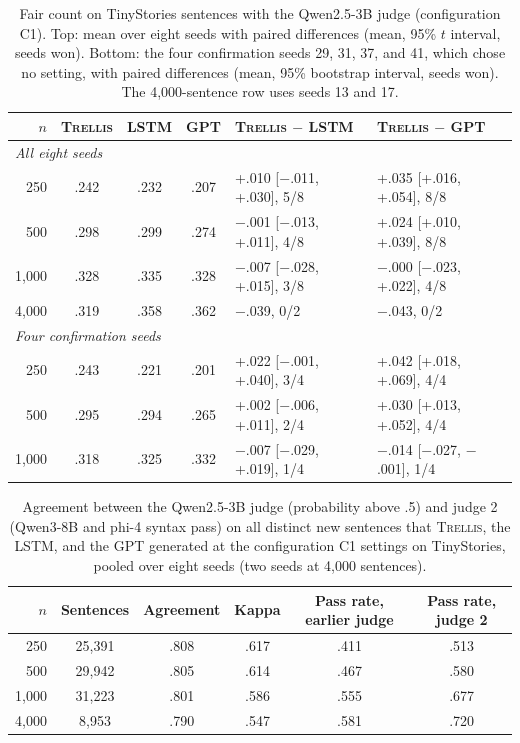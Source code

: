 \documentclass[11pt,letterpaper]{article}
\newcommand{\trellis}{\textsc{Trellis}}
\begin{document}
\begin{table}[h]
\caption{Fair count on TinyStories sentences with the Qwen2.5-3B judge (configuration C1). Top: mean over eight seeds with paired differences (mean, 95\% $t$ interval, seeds won).
Bottom: the four confirmation seeds 29, 31, 37, and 41, which chose no setting, with paired differences (mean, 95\% bootstrap interval, seeds won). The 4,000-sentence row uses seeds 13 and 17.}
\label{tab:genold}
\begin{center}
\footnotesize
\begin{tabular}{rcccll}
\toprule
$n$ & \trellis{} & LSTM & GPT & \trellis{} $-$ LSTM & \trellis{} $-$ GPT \\
\midrule
\multicolumn{6}{l}{\textit{All eight seeds}} \\
250   & .242 & .232 & .207 & +.010 [$-$.011, +.030], 5/8 & +.035 [+.016, +.054], 8/8 \\
500   & .298 & .299 & .274 & $-$.001 [$-$.013, +.011], 4/8 & +.024 [+.010, +.039], 8/8 \\
1,000 & .328 & .335 & .328 & $-$.007 [$-$.028, +.015], 3/8 & $-$.000 [$-$.023, +.022], 4/8 \\
4,000 & .319 & .358 & .362 & $-$.039, 0/2 & $-$.043, 0/2 \\
\midrule
\multicolumn{6}{l}{\textit{Four confirmation seeds}} \\
250   & .243 & .221 & .201 & +.022 [$-$.001, +.040], 3/4 & +.042 [+.018, +.069], 4/4 \\
500   & .295 & .294 & .265 & +.002 [$-$.006, +.011], 2/4 & +.030 [+.013, +.052], 4/4 \\
1,000 & .318 & .325 & .332 & $-$.007 [$-$.029, +.019], 1/4 & $-$.014 [$-$.027, $-$.001], 1/4 \\
\bottomrule
\end{tabular}
\end{center}
\end{table}

\begin{table}[h]
\caption{Agreement between the Qwen2.5-3B judge (probability above .5) and judge 2 (Qwen3-8B and phi-4 syntax pass) on all distinct new sentences that \trellis{}, the LSTM, and the GPT generated at the configuration C1 settings on TinyStories, pooled over eight seeds (two seeds at 4,000 sentences).}
\label{tab:agree}
\begin{center}
\small
\begin{tabular}{rccccc}
\toprule
$n$ & Sentences & Agreement & Kappa & Pass rate, earlier judge & Pass rate, judge 2 \\
\midrule
250 & 25,391 & .808 & .617 & .411 & .513 \\
500 & 29,942 & .805 & .614 & .467 & .580 \\
1,000 & 31,223 & .801 & .586 & .555 & .677 \\
4,000 & 8,953 & .790 & .547 & .581 & .720 \\
\bottomrule
\end{tabular}
\end{center}
\end{table}
\end{document}
